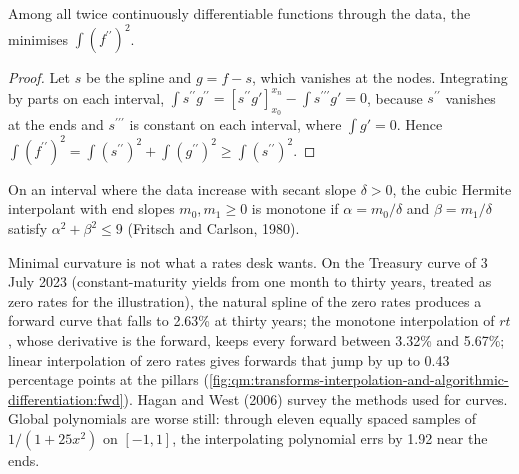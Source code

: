 \begin{proposition}\label{prop:qm:transforms-interpolation-and-algorithmic-differentiation:minimal}
Among all twice continuously differentiable functions through the data, the  minimises $\int(f^{\prime\prime})^2$.
\end{proposition}

\begin{proof}
Let $s$ be the spline and $g = f - s$, which vanishes at the nodes. Integrating by parts on each interval, $\int s^{\prime\prime}g^{\prime\prime} = [s^{\prime\prime}g']_{x_0}^{x_n} - \int s^{\prime\prime\prime}g' = 0$, because $s^{\prime\prime}$ vanishes at the ends and $s^{\prime\prime\prime}$ is
constant on each interval, where $\int g' = 0$. Hence $\int(f^{\prime\prime})^2 = \int(s^{\prime\prime})^2 + \int(g^{\prime\prime})^2 \ge \int(s^{\prime\prime})^2$.
\end{proof}

\begin{proposition}\label{prop:qm:transforms-interpolation-and-algorithmic-differentiation:fc}
On an interval where the data increase with secant slope $\delta > 0$, the cubic Hermite interpolant with end slopes $m_0, m_1 \ge 0$ is monotone if $\alpha = m_0/\delta$ and $\beta = m_1/\delta$ satisfy
$\alpha^2 + \beta^2 \le 9$ (Fritsch and Carlson, 1980).
\end{proposition}

Minimal curvature is not what a rates desk wants. On the Treasury curve of 3 July 2023 (constant-maturity yields from one month to thirty years, treated as zero rates for the illustration), the natural
spline of the zero rates produces a forward curve that falls to 2.63\% at thirty years; the monotone interpolation of $rt$, whose derivative is the forward, keeps every forward between 3.32\% and 5.67\%;
linear interpolation of zero rates gives forwards that jump by up to 0.43 percentage points at the pillars (\cref{fig:qm:transforms-interpolation-and-algorithmic-differentiation:fwd}). Hagan and West (2006)
survey the methods used for curves. Global polynomials are worse still: through eleven equally spaced samples of $1/(1 + 25x^2)$ on $[-1, 1]$, the interpolating polynomial errs by 1.92 near the ends.

